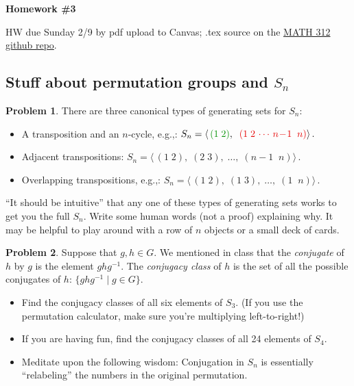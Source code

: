 \documentclass[12pt]{article}
\theoremstyle{definition} %
\newtheorem{problem}{Problem}
\newcommand{\Alert}[1]{\textcolor{xRed}{#1}}
\newcommand{\Balert}[1]{\textcolor{xBlue}{#1}}
\newcommand{\Galert}[1]{\textcolor{xGreen}{#1}}
\newcommand{\Palert}[1]{\textcolor{xPurple}{#1}}
\newcommand\inv{^{-1}} %
\def\<{\langle}
\def\>{\rangle}
\renewcommand{\section}[1]{\begin{center} \textbf{#1} \\\end{center}}
\begin{document}
\section{Homework \#3} %

HW due Sunday 2/9 by pdf upload to Canvas; .tex source on the \href{https://github.com/rhinopotamus/math312}{MATH 312 github repo}.

\subsection*{Stuff about permutation groups and $S_n$}

\begin{problem}
    There are three canonical types of generating sets for $S_n$:
    \begin{itemize}
        \item A \Galert{transposition} and an \Alert{$n$-cycle},
        e.g.,: 
        \(
        S_n=\<\,\Galert{(1\;2)},\;\;\Alert{(1\;2\,\cdots\,
            n\!-\!1\;\;n)}\>\,.
        \)
        
        \item \Balert{Adjacent transpositions}:
        \(
        S_n=\<\,(1\;2),\;(2\; 3),\;\dots,\; (n-1\;\;n)\>\,. 
        \)

        \item \Palert{Overlapping transpositions}, e.g.,:
        \(
        S_n=\<\,(1\;2),\;(1\; 3),\;\dots,\; (1\;\;n)\>\,. 
        \)
    \end{itemize}
    ``It should be intuitive'' that any one of these types of generating sets works to get you the full $S_n$. Write some human words (not a proof) explaining why. It may be helpful to play around with a row of $n$ objects or a small deck of cards.
\end{problem}

\begin{problem}
    Suppose that $g, h \in G$. We mentioned in class that the \textit{conjugate} of $h$ by $g$ is the element $ghg\inv$. The \textit{conjugacy class} of $h$ is the set of all the possible conjugates of $h$: $\{ghg\inv \mid g\in G\}.$
    \begin{itemize}
        \item Find the conjugacy classes of all six elements of $S_3$. (If you use the permutation calculator, make sure you're multiplying left-to-right!) 
        \item If you are having fun, find the conjugacy classes of all 24 elements of $S_4$.
        \item Meditate upon the following wisdom: Conjugation in $S_n$ is essentially ``relabeling'' the numbers in the original permutation.
    \end{itemize}
\end{problem}
\end{document}
